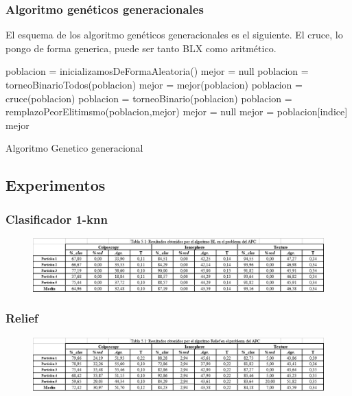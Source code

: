 \documentclass[12pt,a4paper]{article}
\begin{document}
\subsubsection{Algoritmo genéticos generacionales}
El esquema de los algoritmo genéticos generacionales es el siguiente. El cruce, lo pongo de forma generica, puede ser tanto BLX como aritmético. 

\begin{algorithm}[H]
	\begin{algorithmic}[1]
		\State poblacion = inicializamosDeFormaAleatoria()
		\State mejor = null
		\State poblacion = torneoBinarioTodos(poblacion)
		\State mejor = mejor(poblacion)
		\State poblacion = cruce(poblacion)
		\State poblacion = torneoBinario(poblacion)
		\State poblacion = remplazoPeorElitimsmo(poblacion,mejor)
		\EndFor
		\State mejor = null
		\State mejor = poblacion[indice]
		\EndIf %
		\EndFor	
		\State \Return mejor
	\end{algorithmic}
	\label{alg:knn}
	\caption{Algoritmo Genetico generacional}
\end{algorithm}



\subsection{Experimentos}
\subsubsection{Clasificador 1-knn}
\begin{figure}[H]
	\centering
	\includegraphics[width=0.7\linewidth]{images/poblacion1}
	\caption{}
	\label{fig:poblacion1}
\end{figure}
\subsubsection{Relief}
\begin{figure}[H]
	\centering
	\includegraphics[width=0.7\linewidth]{images/poblacion2}
	\caption{}
	\label{fig:poblacion2}
\end{figure}
\end{document}
